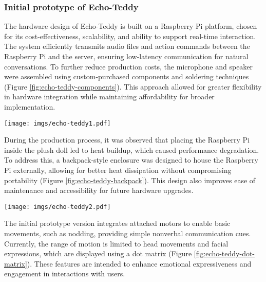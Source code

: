 \subsubsection{Initial prototype of Echo-Teddy}

The hardware design of Echo-Teddy is built on a Raspberry Pi platform, chosen for its cost-effectiveness, scalability, and ability to support real-time interaction. The system efficiently transmits audio files and action commands between the Raspberry Pi and the server, ensuring low-latency communication for natural conversations. To further reduce production costs, the microphone and speaker were assembled using custom-purchased components and soldering techniques (Figure \ref{fig:echo-teddy-components}). This approach allowed for greater flexibility in hardware integration while maintaining affordability for broader implementation.

\begin{figure*}[hbt!]
    \centering
    \texttt{[image: imgs/echo-teddy1.pdf]}
    \caption{To reduce costs, we purchased microphone and speaker components separately and assembled them using soldering techniques.}
    \label{fig:echo-teddy-components}
\end{figure*}

During the production process, it was observed that placing the Raspberry Pi inside the plush doll led to heat buildup, which caused performance degradation. To address this, a backpack-style enclosure was designed to house the Raspberry Pi externally, allowing for better heat dissipation without compromising portability (Figure \ref{fig:echo-teddy-backpack}). This design also improves ease of maintenance and accessibility for future hardware upgrades.

\begin{figure*}[hbt!]
    \centering
    \texttt{[image: imgs/echo-teddy2.pdf]}
    \caption{To prevent the heat buildup, we made backpack to contain the Raspberry Pi.}
    \label{fig:echo-teddy-backpack}
\end{figure*}

The initial prototype version integrates attached motors to enable basic movements, such as nodding, providing simple nonverbal communication cues. Currently, the range of motion is limited to head movements and facial expressions, which are displayed using a dot matrix (Figure \ref{fig:echo-teddy-dot-matrix}). These features are intended to enhance emotional expressiveness and engagement in interactions with users. 

